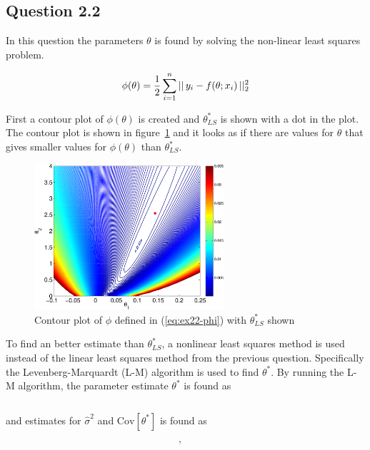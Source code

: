 \subsection*{Question 2.2}


In this question the parameters $\theta$ is found by solving the non-linear least squares problem.

\begin{equation}\label{eq:ex22-phi}
    \phi(\theta) = \frac{1}{2}\sum_{i=1}^n ||\,y_i - f(\theta; x_i)\,||_2^2
\end{equation}

First a contour plot of $\phi(\theta)$ is created and $\theta_{LS}^*$ is shown with a dot in the plot. The contour plot is shown in figure~\ref{fig:ex22-contour-linear} and it looks as if there are values for $\theta$ that gives smaller values for $\phi(\theta)$ than $\theta_{LS}^*$.

\begin{figure}[ht]
    \centering
    \includegraphics[width=70mm]{../media/ex22-contour-linear.pdf}
    \caption{Contour plot of $\phi$ defined in (\ref{eq:ex22-phi}) with $\theta_{LS}^*$ shown}
    \label{fig:ex22-contour-linear}
\end{figure}

To find an better estimate than $\theta_{LS}^*$, a nonlinear least squares method is used instead of the linear least squares method from the previous question. Specifically the Levenberg-Marquardt (L-M) algorithm is used to find $\theta^*$. By running the L-M algorithm, the parameter estimate $\theta^*$ is found as

\begin{equation*}
    
\end{equation*}

and estimates for $\hat{\sigma}^2$ and $\text{Cov}[\theta^*]$ is found as

\begin{equation*}
    , \quad 
\end{equation*}

